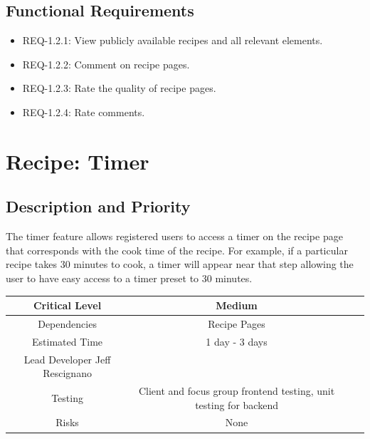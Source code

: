 \documentclass{scrreprt}
\begin{document}
\subsection{\gls{Functional Requirements}}

\begin{itemize}
    \item REQ-1.2.1: View publicly available recipes and all relevant elements.
    \item REQ-1.2.2: Comment on recipe pages.
    \item REQ-1.2.3: Rate the quality of recipe pages.
    \item REQ-1.2.4: Rate comments.
\end{itemize}

\section{Recipe: Timer}

\subsection{Description and Priority}

The timer feature allows registered users to access a timer on the recipe page that corresponds with the cook time of the recipe. For example, if a particular recipe takes 30 minutes to cook, a timer will appear near that step allowing the user to have easy access to a timer preset to 30 minutes.

\begin{center}
    \begin{tabular}{| c | c | c | c |}
        \hline
        Critical Level & Medium                                                            \\
        \hline
        Dependencies   & Recipe Pages                                                      \\
        \hline
        Estimated Time & 1 day - 3 days                                                    \\
        \hline
        Lead Developer Jeff Rescignano                                                \\
        \hline
        Testing         & Client and focus group \gls{frontend} testing,
                          \gls{unit testing} for \gls{backend}                             \\
        \hline
        Risks          & None                                                              \\
        \hline
    \end{tabular}
\end{center}
\end{document}
